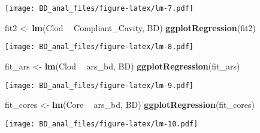 \documentclass[]{article}
\newenvironment{Shaded}{\begin{snugshade}}{\end{snugshade}}
\newcommand{\KeywordTok}[1]{\textcolor[rgb]{0.13,0.29,0.53}{\textbf{#1}}}
\newcommand{\DataTypeTok}[1]{\textcolor[rgb]{0.13,0.29,0.53}{#1}}
\newcommand{\StringTok}[1]{\textcolor[rgb]{0.31,0.60,0.02}{#1}}
\newcommand{\OperatorTok}[1]{\textcolor[rgb]{0.81,0.36,0.00}{\textbf{#1}}}
\newcommand{\NormalTok}[1]{#1}
\begin{document}
\texttt{[image: BD\_anal\_files/figure-latex/lm-7.pdf]}

\begin{Shaded}
\begin{Highlighting}[]
\NormalTok{  fit2 <-}\StringTok{ }\KeywordTok{lm}\NormalTok{(Clod }\OperatorTok{~}\StringTok{ }\NormalTok{Compliant_Cavity, BD)}
 \KeywordTok{ggplotRegression}\NormalTok{(fit2)}
\end{Highlighting}
\end{Shaded}

\texttt{[image: BD\_anal\_files/figure-latex/lm-8.pdf]}

\begin{Shaded}
\begin{Highlighting}[]
\NormalTok{  fit_ars <-}\StringTok{ }\KeywordTok{lm}\NormalTok{(Clod }\OperatorTok{~}\StringTok{ }\NormalTok{ars_bd, BD)}
  \KeywordTok{ggplotRegression}\NormalTok{(fit_ars) }
\end{Highlighting}
\end{Shaded}

\texttt{[image: BD\_anal\_files/figure-latex/lm-9.pdf]}

\begin{Shaded}
\begin{Highlighting}[]
\NormalTok{ fit_cores <-}\StringTok{ }\KeywordTok{lm}\NormalTok{(Core }\OperatorTok{~}\StringTok{ }\NormalTok{ars_bd, BD)}
  \KeywordTok{ggplotRegression}\NormalTok{(fit_cores) }
\end{Highlighting}
\end{Shaded}

\texttt{[image: BD\_anal\_files/figure-latex/lm-10.pdf]}

\begin{Shaded}
\end{Shaded}
\end{document}
